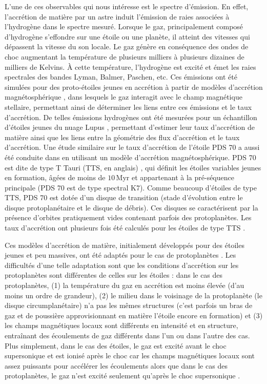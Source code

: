 L'une de ces observables qui nous intéresse est le spectre d'émission. En effet, l'accrétion de matière par un astre induit l'émission de raies associées à l'hydrogène dans le spectre mesuré. Lorsque le gaz, principalement composé d'hydrogène s'effondre sur une étoile ou une planète, il atteint des vitesses qui dépassent la vitesse du son locale. Le gaz génère en conséquence des ondes de choc augmentant la température de plusieurs milliers à plusieurs dizaines de milliers de Kelvins. À cette température, l'hydrogène est excité et émet les raies spectrales des bandes Lyman, Balmer, Paschen, etc. Ces émissions ont été simulées pour des proto-étoiles jeunes en accrétion à partir de modèles d'accrétion magnétosphérique \citep{muzerolle2001, natta2004, espaillat2008}, dans lesquels le gaz interagit avec le champ magnétique stellaire, permettant ainsi de déterminer les liens entre ces émissions et le taux d'accrétion. De telles émissions hydrogènes ont été mesurées pour un échantillon d'étoiles jeunes du nuage Lupus \citep{alcala2014, alcala2017}, permettant d'estimer leur taux d'accrétion de matière ainsi que les liens entre la géométrie des flux d'accrétion et le taux d'accrétion. Une étude similaire sur le taux d'accrétion de l'étoile PDS 70 a aussi été conduite dans \cite{thanathibodee2020} en utilisant un modèle d'accrétion magnétosphérique. PDS 70 est dite de type T Tauri (\ac{TTS}, en anglais) \citep{appenzeller1989}, qui définit les étoiles variables jeunes en formation, âgées de moins de $10 \,$Myr et appartenant à la pré-séquence principale (PDS 70 est de type spectral K7). Comme beaucoup d'étoiles de type \ac{TTS}, PDS 70 est dotée d'un disque de transition (stade d'évolution entre le disque protoplanétaire et le disque de débris). Ces disques se caractérisent par la présence d'orbites pratiquement vides contenant parfois des protoplanètes. Les taux d'accrétion ont plusieurs fois été calculés pour les étoiles de type \ac{TTS} \citep{natta2004, rigliaco2012, ingleby2013}.

Ces modèles d'accrétion de matière, initialement développés pour des étoiles jeunes et peu massives, ont été adaptés pour le cas de protoplanètes \citep{aoyama2018, thanathibodee2019}. Les difficultés d'une telle adaptation sont que les conditions d'accrétion sur les protoplanètes sont différentes de celles sur les étoiles : dans le cas des protoplanètes, (1) la température du gaz en accrétion est moins élevée (d'au moins un ordre de grandeur), (2) le milieu dans le voisinage de la protoplanète (le disque circumplanétaire) n'a pas les mêmes structures (c'est parfois un bras de gaz et de poussière \citep{boccaletti2020} approvisionnant en matière l'étoile encore en formation) et (3) les champs magnétiques locaux sont différents en intensité et en structure, entraînant des écoulements de gaz différents dans l'un ou dans l'autre des cas. Plus simplement, dans le cas des étoiles, le gaz est excité avant le choc supersonique et est ionisé après le choc car les champs magnétiques locaux sont assez puissants pour accélérer les écoulements alors que dans le cas des protoplanètes, le gaz n'est excité seulement qu'après le choc supersonique \citep{aoyama2019}.

